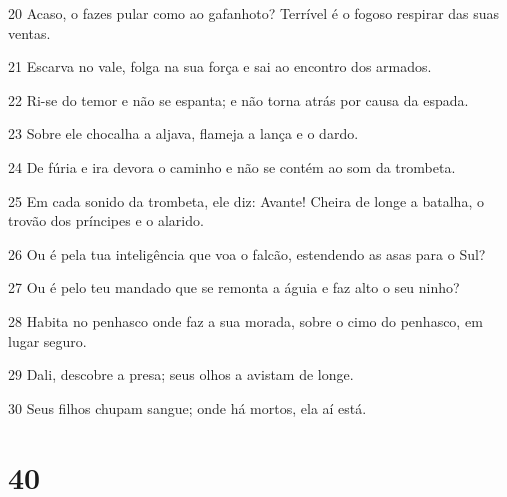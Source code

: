 \par 20 Acaso, o fazes pular como ao gafanhoto? Terrível é o fogoso respirar das suas ventas.
\par 21 Escarva no vale, folga na sua força e sai ao encontro dos armados.
\par 22 Ri-se do temor e não se espanta; e não torna atrás por causa da espada.
\par 23 Sobre ele chocalha a aljava, flameja a lança e o dardo.
\par 24 De fúria e ira devora o caminho e não se contém ao som da trombeta.
\par 25 Em cada sonido da trombeta, ele diz: Avante! Cheira de longe a batalha, o trovão dos príncipes e o alarido.
\par 26 Ou é pela tua inteligência que voa o falcão, estendendo as asas para o Sul?
\par 27 Ou é pelo teu mandado que se remonta a águia e faz alto o seu ninho?
\par 28 Habita no penhasco onde faz a sua morada, sobre o cimo do penhasco, em lugar seguro.
\par 29 Dali, descobre a presa; seus olhos a avistam de longe.
\par 30 Seus filhos chupam sangue; onde há mortos, ela aí está.

\chapter{40}

